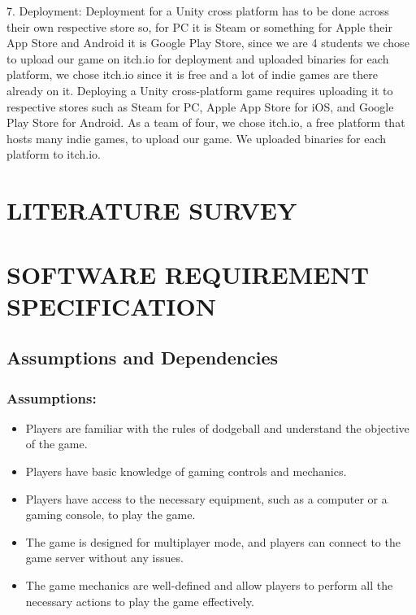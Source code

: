 \documentclass[12pt]{report}
\begin{document}
7.	Deployment: Deployment for a Unity cross platform has to be done across their own respective store so, for PC it is Steam or something for Apple their App Store and Android it is Google Play Store, since we are 4 students we chose to upload our game on itch.io for deployment and uploaded binaries for each platform, we chose itch.io since it is free and a lot of indie games are there already on it. Deploying a Unity cross-platform game requires uploading it to respective stores such as Steam for PC, Apple App Store for iOS, and Google Play Store for Android. As a team of four, we chose itch.io, a free platform that hosts many indie games, to upload our game. We uploaded binaries for each platform to itch.io.

\clearpage

\centering
\section{LITERATURE SURVEY}


\centering
\section{SOFTWARE REQUIREMENT SPECIFICATION}
\raggedright
\subsection{Assumptions and Dependencies}

\justifying
\setlength{\parindent}{4em}
\setlength{\parskip}{0.5em}
\renewcommand{\baselinestretch}{1.5}

\normalsize
\hspace{1.7cm}\subsubsection{Assumptions:}
\begin{itemize}\item Players are familiar with the rules of dodgeball and understand the objective of the game.
\item Players have basic knowledge of gaming controls and mechanics.
\item Players have access to the necessary equipment, such as a computer or a gaming console, to play the game.
\item The game is designed for multiplayer mode, and players can connect to the game server without any issues.
\item The game mechanics are well-defined and allow players to perform all the necessary actions to play the game effectively.
\end{itemize}
\end{document}
